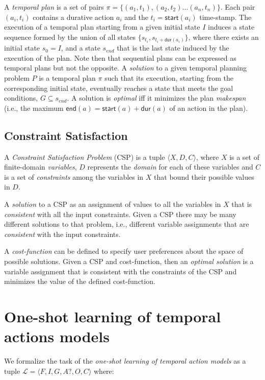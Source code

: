 \documentclass{ecai}
\newcommand{\tup}[1]{{\langle #1 \rangle}}
\newcommand{\dur}{\mathsf{dur}}    %
\newcommand{\start}{\mathsf{start}}%
\newcommand{\en}{\mathsf{end}}     %
\begin{document}
A {\em temporal plan} is a set of pairs $\pi=\{(a_1,t_1),(a_2,t_2)\ldots (a_n,t_n)\}$. Each pair $(a_i,t_i)$ contains a durative action $a_i$ and the $t_i=\start(a_i)$ time-stamp. The execution of a temporal plan starting from a given initial state $I$ induces a state sequence formed by the union of all states $\{s_{t_i}, s_{t_i+\dur(a_i)}\}$, where there exists an initial state $s_{0}=I$, and a state $s_{end}$ that is the last state induced by the execution of the plan. Note then that sequential plans can be expressed as temporal plans but not the opposite. A {\em solution} to a given temporal planning problem $P$ is a temporal plan $\pi$ such that its execution, starting from the corresponding initial state, eventually reaches a state that meets the goal conditions, $G\subseteq s_{end}$. A solution is {\em optimal} iff it minimizes the plan {\em makespan} (i.e., the maximum $\en(a)=\start(a)+\dur(a)$ of an action in the plan).

\subsection{Constraint Satisfaction}
A {\em Constraint Satisfaction Problem} (CSP) is a tuple $\tup{X,D,C}$, where $X$ is a set of finite-domain {\em variables}, $D$ represents the {\em domain} for each of these variables and $C$ is a set of {\em constraints} among the variables in $X$ that bound their possible values in $D$.

A {\em solution} to a CSP as an assignment of values to all the variables in $X$ that is {\em consistent} with all the input constraints. Given a CSP there may be many different solutions to that problem, i.e., different variable assignments that are {\em consistent} with the input constraints.

A {\em cost-function} can be defined to specify user preferences about the space of possible solutions. Given a CSP and cost-function, then an {\em optimal solution} is a variable assignment that is consistent with the constraints of the CSP and minimizes the value of the defined cost-function.



\section{One-shot learning of temporal actions models}
\label{section:learningTemporalModels}
We formalize the task of the {\em one-shot learning of temporal action models} as a tuple $\mathcal{L}=\tup{F,I,G,A?,O,C}$ where:
\end{document}
